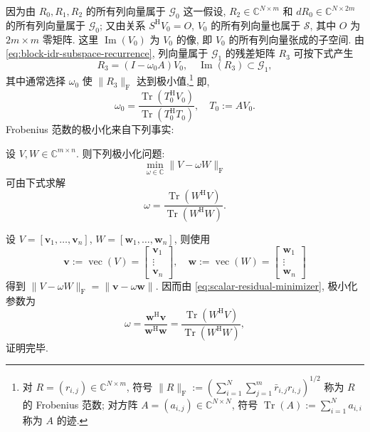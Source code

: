 {因为由 $R_0,R_1,R_2$ 的所有列向量属于 $\mathcal G_0$ 这一假设, $R_2\in\mathbb C^{N\times m}$ 和 $dR_0\in\mathbb C^{N\times2m}$ 的所有列向量属于 $\mathcal G_0$; 又由关系 $S^{\mathrm H}V_0=O$, $V_0$ 的所有列向量也属于 $\mathcal S$, 其中 $O$ 为 $2m\times m$ 零矩阵. 这里 $\operatorname{Im}(V_0)$ 为 $V_0$ 的像, 即 $V_0$ 的所有列向量张成的子空间.}
{由 \eqref{eq:block-idr-subspace-recurrence}, 列向量属于 $\mathcal G_1$ 的残差矩阵 $R_3$ 可按下式产生}
\begin{equation}\label{eq:block-idr-first-reduced-residual}R_3=(I-\omega_0A)V_0,\quad\operatorname{Im}(R_3)\subset\mathcal G_1,\end{equation}
{其中通常选择 $\omega_0$ 使 $\|R_3\|_{\mathrm F}$ 达到极小值,}\footnote{{对 $R=(r_{i,j})\in\mathbb C^{N\times m}$, 符号 $\|R\|_{\mathrm F}:=(\sum_{i=1}^N\sum_{j=1}^m\bar r_{i,j}r_{i,j})^{1/2}$ 称为 $R$ 的 Frobenius 范数; 对方阵 $A=(a_{i,j})\in\mathbb C^{N\times N}$, 符号 $\operatorname{Tr}(A):=\sum_{i=1}^Na_{i,i}$ 称为 $A$ 的迹.}}
{即,}
\[\omega_0=\frac{\operatorname{Tr}(T_0^{\mathrm H}V_0)}{\operatorname{Tr}(T_0^{\mathrm H}T_0)},\quad T_0:=AV_0.\]
{Frobenius 范数的极小化来自下列事实:}
\par{}
\begin{Proposition}\label{prop:frobenius-scalar-minimization}
{设 $V,W\in\mathbb C^{m\times n}$. 则下列极小化问题:}
\[\min_{\omega\in\mathbb C}\|V-\omega W\|_{\mathrm F}\]
{可由下式求解}
\[\omega=\frac{\operatorname{Tr}(W^{\mathrm H}V)}{\operatorname{Tr}(W^{\mathrm H}W)}.\]
\end{Proposition}
\begin{Proof}
{设 $V=[\bm v_1,\ldots,\bm v_n]$, $W=[\bm w_1,\ldots,\bm w_n]$, 则使用}
\[\bm v:=\operatorname{vec}(V)=\begin{bmatrix}\bm v_1\\\vdots\\\bm v_n\end{bmatrix},\quad\bm w:=\operatorname{vec}(W)=\begin{bmatrix}\bm w_1\\\vdots\\\bm w_n\end{bmatrix}\]
{得到 $\|V-\omega W\|_{\mathrm F}=\|\bm v-\omega\bm w\|$. 因而由 \eqref{eq:scalar-residual-minimizer}, 极小化参数为}
\[\omega=\frac{\bm w^{\mathrm H}\bm v}{\bm w^{\mathrm H}\bm w}=\frac{\operatorname{Tr}(W^{\mathrm H}V)}{\operatorname{Tr}(W^{\mathrm H}W)},\]
{证明完毕.}
\par\nopagebreak[4]
\end{Proof}
